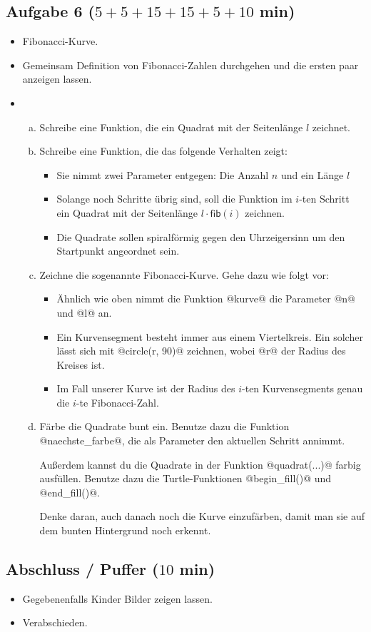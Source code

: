 	\subsection{Aufgabe 6 ($5 + 5 + 15 + 15 + 5 + 10$ min)}
	\begin{itemize}
		\item 
		Fibonacci-Kurve.
		\item
		Gemeinsam Definition von Fibonacci-Zahlen durchgehen und die ersten paar anzeigen lassen.
		\item
		\begin{enumerate}[(a)]
			\item 
			Schreibe eine Funktion, die ein Quadrat mit der Seitenlänge $l$ zeichnet.
			\item
			Schreibe eine Funktion, die das folgende Verhalten zeigt:
			\begin{itemize}
				\item 
				Sie nimmt zwei Parameter entgegen: Die Anzahl $n$ und ein Länge $l$
				\item
				Solange noch Schritte übrig sind, soll die Funktion im $i$-ten Schritt ein Quadrat mit der Seitenlänge $l\cdot\mathsf{fib}(i)$ zeichnen.
				\item
				Die Quadrate sollen spiralförmig gegen den Uhrzeigersinn um den Startpunkt angeordnet sein.
			\end{itemize}
			\item
			Zeichne die sogenannte Fibonacci-Kurve. Gehe dazu wie folgt vor:
			\begin{itemize}
				\item 
				Ähnlich wie oben nimmt die Funktion @kurve@ die Parameter @n@ und @l@ an.
				\item
				Ein Kurvensegment besteht immer aus einem Viertelkreis. Ein solcher lässt sich mit @circle(r, 90)@ zeichnen, wobei @r@ der Radius des Kreises ist.
				\item
				Im Fall unserer Kurve ist der Radius des $i$-ten Kurvensegments genau die $i$-te Fibonacci-Zahl.
			\end{itemize}
			\item
			Färbe die Quadrate bunt ein. Benutze dazu die Funktion @naechste_farbe@, die als Parameter den aktuellen Schritt annimmt. 
			
			Außerdem kannst du die Quadrate in der Funktion @quadrat(...)@ farbig ausfüllen. Benutze dazu die Turtle-Funktionen @begin_fill()@ und @end_fill()@.
			
			Denke daran, auch danach noch die Kurve einzufärben, damit man sie auf dem bunten Hintergrund noch erkennt.
		\end{enumerate}
	\end{itemize}

	\subsection{Abschluss / Puffer ($10$ min)}
	\begin{itemize}
		\item 
		Gegebenenfalls Kinder Bilder zeigen lassen.
		\item
		Verabschieden.
	\end{itemize}

	
	

